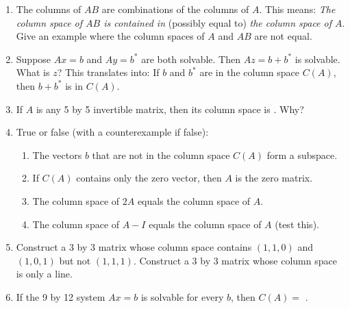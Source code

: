 \documentclass[14pt, a4paper]{article}
\begin{document}
\begin{enumerate}
    \item The columns of $AB$ are combinations of the columns of $A$. This means: \textit{The column space of $AB$ is contained in} (possibly equal to) \textit{the column space of $A$}. Give an example where the column spaces of $A$ and $AB$ are not equal.

    \item Suppose $Ax = b$ and $Ay = b^*$ are both solvable. Then $Az = b + b^*$ is solvable. What is $z$? This translates into: If $b$ and $b^*$ are in the column space $C(A)$, then $b + b^*$ is in $C(A)$.

    \item If $A$ is any 5 by 5 invertible matrix, then its column space is \underline{\hspace{3cm}}. Why?

    \item True or false (with a counterexample if false):
          \begin{enumerate}
              \item The vectors $b$ that are not in the column space $C(A)$ form a subspace.
              \item If $C(A)$ contains only the zero vector, then $A$ is the zero matrix.
              \item The column space of $2A$ equals the column space of $A$.
              \item The column space of $A - I$ equals the column space of $A$ (test this).
          \end{enumerate}

    \item Construct a 3 by 3 matrix whose column space contains $(1,1,0)$ and $(1,0,1)$ but not $(1,1,1)$. Construct a 3 by 3 matrix whose column space is only a line.

    \item If the 9 by 12 system $Ax = b$ is solvable for every $b$, then $C(A) =$ \underline{\hspace{3cm}}.
\end{enumerate}
\end{document}
